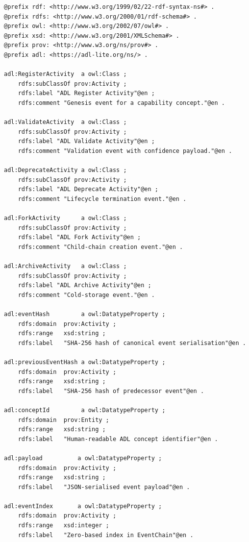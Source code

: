 \begin{lstlisting}[language=Turtle, caption={Complete ADL Lite PROV-O profile (Turtle serialisation).}, label={app:lst:prov-full-profile}]
@prefix rdf: <http://www.w3.org/1999/02/22-rdf-syntax-ns#> .
@prefix rdfs: <http://www.w3.org/2000/01/rdf-schema#> .
@prefix owl: <http://www.w3.org/2002/07/owl#> .
@prefix xsd: <http://www.w3.org/2001/XMLSchema#> .
@prefix prov: <http://www.w3.org/ns/prov#> .
@prefix adl: <https://adl-lite.org/ns/> .

adl:RegisterActivity  a owl:Class ;
    rdfs:subClassOf prov:Activity ;
    rdfs:label "ADL Register Activity"@en ;
    rdfs:comment "Genesis event for a capability concept."@en .

adl:ValidateActivity  a owl:Class ;
    rdfs:subClassOf prov:Activity ;
    rdfs:label "ADL Validate Activity"@en ;
    rdfs:comment "Validation event with confidence payload."@en .

adl:DeprecateActivity a owl:Class ;
    rdfs:subClassOf prov:Activity ;
    rdfs:label "ADL Deprecate Activity"@en ;
    rdfs:comment "Lifecycle termination event."@en .

adl:ForkActivity      a owl:Class ;
    rdfs:subClassOf prov:Activity ;
    rdfs:label "ADL Fork Activity"@en ;
    rdfs:comment "Child-chain creation event."@en .

adl:ArchiveActivity   a owl:Class ;
    rdfs:subClassOf prov:Activity ;
    rdfs:label "ADL Archive Activity"@en ;
    rdfs:comment "Cold-storage event."@en .

adl:eventHash         a owl:DatatypeProperty ;
    rdfs:domain  prov:Activity ;
    rdfs:range   xsd:string ;
    rdfs:label   "SHA-256 hash of canonical event serialisation"@en .

adl:previousEventHash a owl:DatatypeProperty ;
    rdfs:domain  prov:Activity ;
    rdfs:range   xsd:string ;
    rdfs:label   "SHA-256 hash of predecessor event"@en .

adl:conceptId         a owl:DatatypeProperty ;
    rdfs:domain  prov:Entity ;
    rdfs:range   xsd:string ;
    rdfs:label   "Human-readable ADL concept identifier"@en .

adl:payload          a owl:DatatypeProperty ;
    rdfs:domain  prov:Activity ;
    rdfs:range   xsd:string ;
    rdfs:label   "JSON-serialised event payload"@en .

adl:eventIndex       a owl:DatatypeProperty ;
    rdfs:domain  prov:Activity ;
    rdfs:range   xsd:integer ;
    rdfs:label   "Zero-based index in EventChain"@en .
\end{lstlisting}
